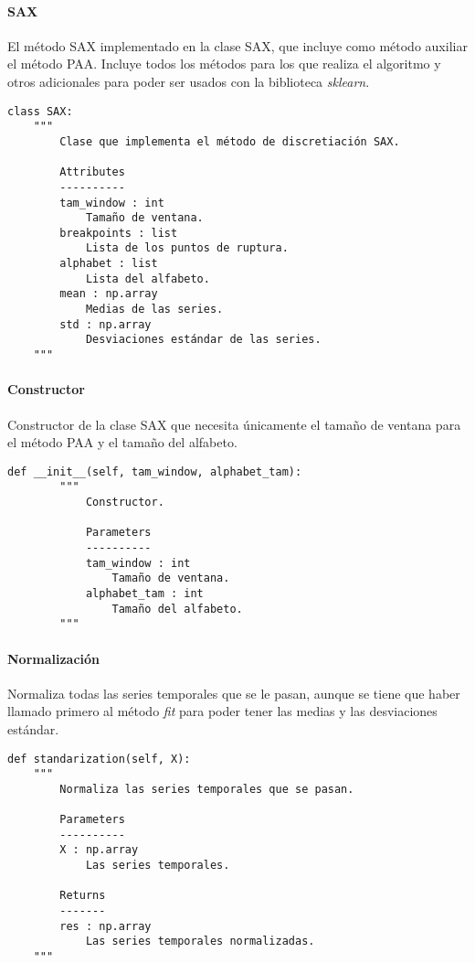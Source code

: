 \paragraph{SAX}

El método SAX implementado en la clase SAX, que incluye como método auxiliar el método PAA. Incluye todos los métodos para los que realiza el algoritmo y otros adicionales para poder ser usados con la biblioteca \emph{sklearn}.

\begin{lstlisting}
class SAX:
    """
        Clase que implementa el método de discretiación SAX.

        Attributes
        ----------
        tam_window : int
            Tamaño de ventana.
        breakpoints : list
            Lista de los puntos de ruptura.
        alphabet : list
            Lista del alfabeto.
        mean : np.array
            Medias de las series.
        std : np.array
            Desviaciones estándar de las series.
    """
\end{lstlisting}

\paragraph{Constructor}

Constructor de la clase SAX que necesita únicamente el tamaño de ventana para el método PAA y el tamaño del alfabeto.

\begin{lstlisting}
def __init__(self, tam_window, alphabet_tam):
        """
            Constructor.

            Parameters
            ----------
            tam_window : int
                Tamaño de ventana.
            alphabet_tam : int
                Tamaño del alfabeto.
        """
\end{lstlisting}

\paragraph{Normalización}

Normaliza todas las series temporales que se le pasan, aunque se tiene que haber llamado primero al método \emph{fit} para poder tener las medias y las desviaciones estándar.

\begin{lstlisting}
def standarization(self, X):
    """
        Normaliza las series temporales que se pasan.

        Parameters
        ----------
        X : np.array
            Las series temporales.

        Returns
        -------
        res : np.array
            Las series temporales normalizadas.
    """
\end{lstlisting}

